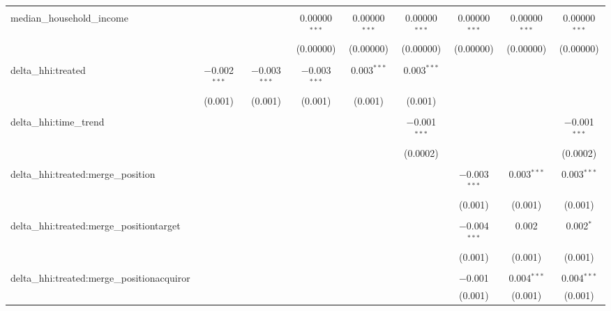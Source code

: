 \begin{table}[H]
{\begin{tabular}{@{\extracolsep{5pt}}lcccccccc}
   & & & & & & & & \\  

  median\_household\_income &  &  & 0.00000$^{***}$ & 0.00000$^{***}$ & 0.00000$^{***}$ & 0.00000$^{***}$ & 0.00000$^{***}$ & 0.00000$^{***}$ \\  

   &  &  & (0.00000) & (0.00000) & (0.00000) & (0.00000) & (0.00000) & (0.00000) \\  

   & & & & & & & & \\  

  delta\_hhi:treated & $-$0.002$^{***}$ & $-$0.003$^{***}$ & $-$0.003$^{***}$ & 0.003$^{***}$ & 0.003$^{***}$ &  &  &  \\  

   & (0.001) & (0.001) & (0.001) & (0.001) & (0.001) &  &  &  \\  

   & & & & & & & & \\  

  delta\_hhi:time\_trend &  &  &  &  & $-$0.001$^{***}$ &  &  & $-$0.001$^{***}$ \\  

   &  &  &  &  & (0.0002) &  &  & (0.0002) \\  

   & & & & & & & & \\  

  delta\_hhi:treated:merge\_position &  &  &  &  &  & $-$0.003$^{***}$ & 0.003$^{***}$ & 0.003$^{***}$ \\  

   &  &  &  &  &  & (0.001) & (0.001) & (0.001) \\  

   & & & & & & & & \\  

  delta\_hhi:treated:merge\_positiontarget &  &  &  &  &  & $-$0.004$^{***}$ & 0.002 & 0.002$^{*}$ \\  

   &  &  &  &  &  & (0.001) & (0.001) & (0.001) \\  

   & & & & & & & & \\  

  delta\_hhi:treated:merge\_positionacquiror &  &  &  &  &  & $-$0.001 & 0.004$^{***}$ & 0.004$^{***}$ \\  

   &  &  &  &  &  & (0.001) & (0.001) & (0.001) \\  


\end{tabular}}
\end{table}
